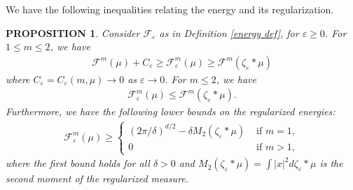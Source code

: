\documentclass[11pt,leqno]{amsart}
\newtheorem{prop}[thm]{PROPOSITION}
\theoremstyle{definition}
\newcommand{\F}{\mathcal{F}}
\def\e{\varepsilon}
\def\F{\mathcal{F}}
\begin{document}
We have the following inequalities relating the energy and its regularization.

\begin{prop} \label{relative sizes lemma}
Consider $\F_\e$ as in Definition \ref{energy def}, for $\e \geq 0$. For $1 \leq m \leq 2$, we have
\begin{align} \label{relative sizes equation}
\F^m(\mu) + C_\e \geq \F^m_\e(\mu) \geq \F^m(\zeta_\e*\mu) 
\end{align}
where $C_\e= C_\e(m,\mu)  \to 0$ as $\e \to 0$. For $m \leq 2$, we have
\begin{align} \label{relative sizes equation 2}
 \F^m_\e(\mu) \leq \F^m(\zeta_\e*\mu) .
 \end{align}
 Furthermore, we have the following lower bounds on the regularized energies:
 \begin{align} \label{lower bounds}  \F^m_\e(\mu)  \geq  \begin{cases} (2\pi/\delta)^{d/2} - \delta M_2(\zeta_\e*\mu) &\text{ if } m =1, \\ 0 &\text{ if } m>1 ,\end{cases} 
 \end{align}
 where the first bound holds for all $\delta >0$ and $M_2(\zeta_\e*\mu) = \int |x|^2 d\zeta_\e *\mu$ is the second moment of the regularized measure.
\end{prop}
\end{document}
